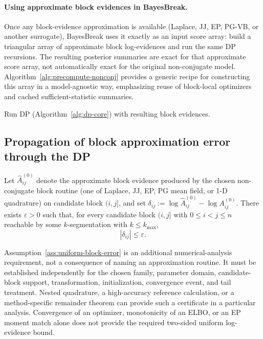 \paragraph{Using approximate block evidences in BayesBreak.}
Once any block-evidence approximation is available (Laplace, JJ, EP, PG-VB, or another surrogate), BayesBreak uses it exactly as an input score array: build a triangular array of approximate block log-evidences and run the same DP recursions. The resulting posterior summaries are exact for that approximate score array, not automatically exact for the original non-conjugate model.
Algorithm~\ref{alg:precompute-nonconj} provides a generic recipe for constructing this array in a model-agnostic way, emphasizing reuse of block-local optimizers and cached sufficient-statistic summaries.

\begin{algorithm}[H]
\caption{Precompute block evidences for non-conjugate GLMs}
\label{alg:precompute-nonconj}
\For{$i=0$ \KwTo $n-1$}{
  Initialize running summaries (as needed)\;
  \For{$j=i+1$ \KwTo $n$}{
    Update block summaries for $(i,j]$\;
    Call chosen block routine to compute $\widehat{A}^{(0)}_{ij}$ (and optional moments)\;
  }
}
Run DP (Algorithm~\ref{alg:dp-core}) with resulting block evidences.
\end{algorithm}

\subsection{Propagation of block approximation error through the DP}

\begin{assumption}
\label{ass:uniform-block-error}
Let $\widehat A^{(0)}_{ij}$ denote the approximate block evidence produced by the chosen
non-conjugate block routine (one of Laplace, JJ, EP, PG mean field, or 1-D quadrature) on
candidate block $(i,j]$, and set $\delta_{ij}:=\log\widehat A^{(0)}_{ij}-\log A^{(0)}_{ij}$.
There exists $\varepsilon>0$ such that, for every candidate block $(i,j]$ with
$0\le i<j\le n$ reachable by some $k$-segmentation with $k\le k_{\max}$,
\[
|\delta_{ij}|\le \varepsilon.
\]
\end{assumption}

Assumption~\ref{ass:uniform-block-error} is an additional numerical-analysis requirement, not a
consequence of naming an approximation routine. It must be established independently for the
chosen family, parameter domain, candidate-block support, transformation, initialization,
convergence event, and tail treatment. Nested quadrature, a high-accuracy reference calculation,
or a method-specific remainder theorem can provide such a certificate in a particular analysis.
Convergence of an optimizer, monotonicity of an ELBO, or an EP moment match alone does not provide
the required two-sided uniform log-evidence bound.


